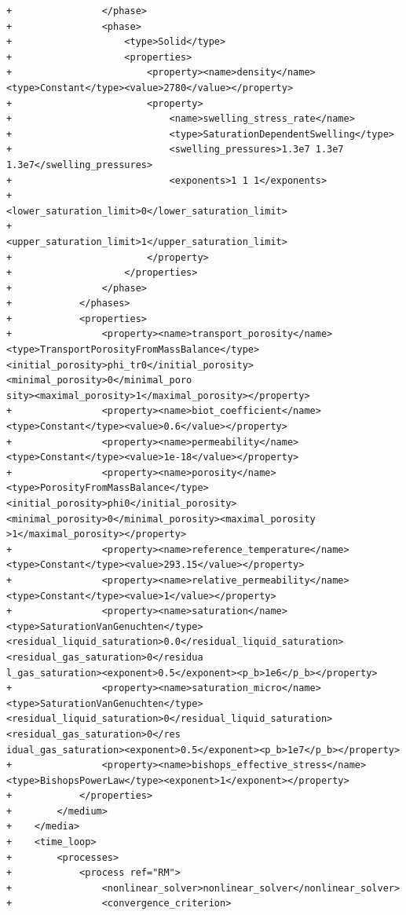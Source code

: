 \documentclass[10pt]{article}
\begin{document}
\begin{lstlisting}
+                </phase>
+                <phase>
+                    <type>Solid</type>
+                    <properties>
+                        <property><name>density</name><type>Constant</type><value>2780</value></property>
+                        <property>
+                            <name>swelling_stress_rate</name>
+                            <type>SaturationDependentSwelling</type>
+                            <swelling_pressures>1.3e7 1.3e7 1.3e7</swelling_pressures>
+                            <exponents>1 1 1</exponents>
+                            <lower_saturation_limit>0</lower_saturation_limit>
+                            <upper_saturation_limit>1</upper_saturation_limit>
+                        </property>
+                    </properties>
+                </phase>
+            </phases>
+            <properties>
+                <property><name>transport_porosity</name><type>TransportPorosityFromMassBalance</type><initial_porosity>phi_tr0</initial_porosity><minimal_porosity>0</minimal_poro
sity><maximal_porosity>1</maximal_porosity></property>
+                <property><name>biot_coefficient</name><type>Constant</type><value>0.6</value></property>
+                <property><name>permeability</name><type>Constant</type><value>1e-18</value></property>
+                <property><name>porosity</name><type>PorosityFromMassBalance</type><initial_porosity>phi0</initial_porosity><minimal_porosity>0</minimal_porosity><maximal_porosity
>1</maximal_porosity></property>
+                <property><name>reference_temperature</name><type>Constant</type><value>293.15</value></property>
+                <property><name>relative_permeability</name><type>Constant</type><value>1</value></property>
+                <property><name>saturation</name><type>SaturationVanGenuchten</type><residual_liquid_saturation>0.0</residual_liquid_saturation><residual_gas_saturation>0</residua
l_gas_saturation><exponent>0.5</exponent><p_b>1e6</p_b></property>
+                <property><name>saturation_micro</name><type>SaturationVanGenuchten</type><residual_liquid_saturation>0</residual_liquid_saturation><residual_gas_saturation>0</res
idual_gas_saturation><exponent>0.5</exponent><p_b>1e7</p_b></property>
+                <property><name>bishops_effective_stress</name><type>BishopsPowerLaw</type><exponent>1</exponent></property>
+            </properties>
+        </medium>
+    </media>
+    <time_loop>
+        <processes>
+            <process ref="RM">
+                <nonlinear_solver>nonlinear_solver</nonlinear_solver>
+                <convergence_criterion>

\end{lstlisting}
\end{document}
